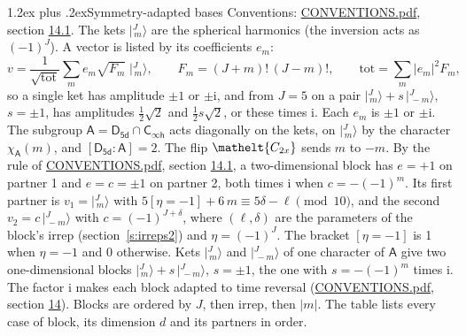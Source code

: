 \documentclass[10pt,a4paper]{article}
\makeatletter
\renewcommand\section{\@startsection{section}{1}{\z@}{-3ex plus -1ex minus -.2ex}%
  {1.2ex plus .2ex}{\normalfont\large\sffamily\bfseries\color{parttitle}}}
\numberwithin{equation}{section}
\newcommand{\eltfont}[1]{{\let\sigma\eltsigma\mathelt{#1}}}
\newcommand{\grp}[1]{\mathsf{#1}}
\newcommand{\elt}[1]{\eltfont{#1}}
\newcommand{\grpindex}[2]{[#1 : #2]}
\newcommand{\iverson}[1]{[#1]}
\newcommand{\iunit}{\mathrm{i}}
\newcommand{\chiA}{\chi_{\grp{A}}}
\newcommand{\jm}[2]{\bigl\lvert{}^{#1}_{\,#2}\bigr\rangle}
\makeatother
\begin{document}
\section{Symmetry-adapted bases}\label{s:bases}
Conventions: \href{../../CONVENTIONS.pdf}{CONVENTIONS.pdf}, section \href{../../CONVENTIONS.pdf\#conv.14.1}{14.1}.
\leavevmode\label{n:index.m}\label{n:vector.ket}The kets $\jm{J}{m}$ are the spherical harmonics (the inversion acts as $(-1)^J$). \label{n:index.ketcoefficient}\label{n:vector.basis.symmetry}\label{n:index.ketweight}\label{n:index.total}A vector is listed by its coefficients $e_m$:
\begin{equation}\label{e:ket}v = \frac{1}{\sqrt{\mathrm{tot}}}\sum_m e_m\sqrt{F_m}\;\jm{J}{m},\qquad F_m = (J+m)!\,(J-m)!,\qquad \mathrm{tot} = \sum_m |e_m|^2F_m,\end{equation}
\leavevmode\label{n:index.pair.sign}so a single ket has amplitude $\pm1$ or $\pm\iunit$, and from $J = 5$ on a pair $\jm{J}{m} + s\,\jm{J}{-m}$, $s = \pm1$, has amplitudes $\tfrac{1}{2}\sqrt{2}$ and $\tfrac{1}{2}s\sqrt{2}$, or these times $\iunit$. Each $e_m$ is $\pm1$ or $\pm\iunit$.
\leavevmode\label{n:group.A}\label{n:function.character.abelian}The subgroup $\grp{A} = \grp{D_{5d}}\cap\grp{C_{\infty h}}$ acts diagonally on the kets, on $\jm{J}{m}$ by the character $\chiA(m)$, and $\grpindex{\grp{D_{5d}}}{\grp{A}} = 2$. The flip $\elt{C_{2x}}$ sends $m$ to $-m$. \label{n:index.partner.sign}By the rule of \href{../../CONVENTIONS.pdf}{CONVENTIONS.pdf}, section \href{../../CONVENTIONS.pdf\#conv.14.1}{14.1}, a two-dimensional block has $e = +1$ on partner 1 and $e = c = \pm1$ on partner 2, both times $\iunit$ when $c = -(-1)^m$. \label{n:index.eta}Its first partner is $v_1 = \jm{J}{m}$ with $5\iverson{\eta = -1} + 6\,m \equiv 5\delta - \ell \pmod{10}$, and the second $v_2 = c\,\jm{J}{-m}$ with $c = (-1)^{J+\delta}$, where $(\ell, \delta)$ are the parameters of the block's irrep (section~\ref{s:irreps2}) and $\eta = (-1)^J$. The bracket $\iverson{\eta = -1}$ is 1 when $\eta = -1$ and 0 otherwise. Kets $\jm{J}{m}$ and $\jm{J}{-m}$ of one character of $\grp{A}$ give two one-dimensional blocks $\jm{J}{m} + s\,\jm{J}{-m}$, $s = \pm1$, the one with $s = -(-1)^m$ times $\iunit$. The factor $\iunit$ makes each block adapted to time reversal (\href{../../CONVENTIONS.pdf}{CONVENTIONS.pdf}, section \href{../../CONVENTIONS.pdf\#conv.14}{14}). Blocks are ordered by $J$, then irrep, then $|m|$.
\leavevmode\label{n:head.case}\label{n:head.partners}The table lists every case of block, its dimension $d$ and its partners in order.
\end{document}
